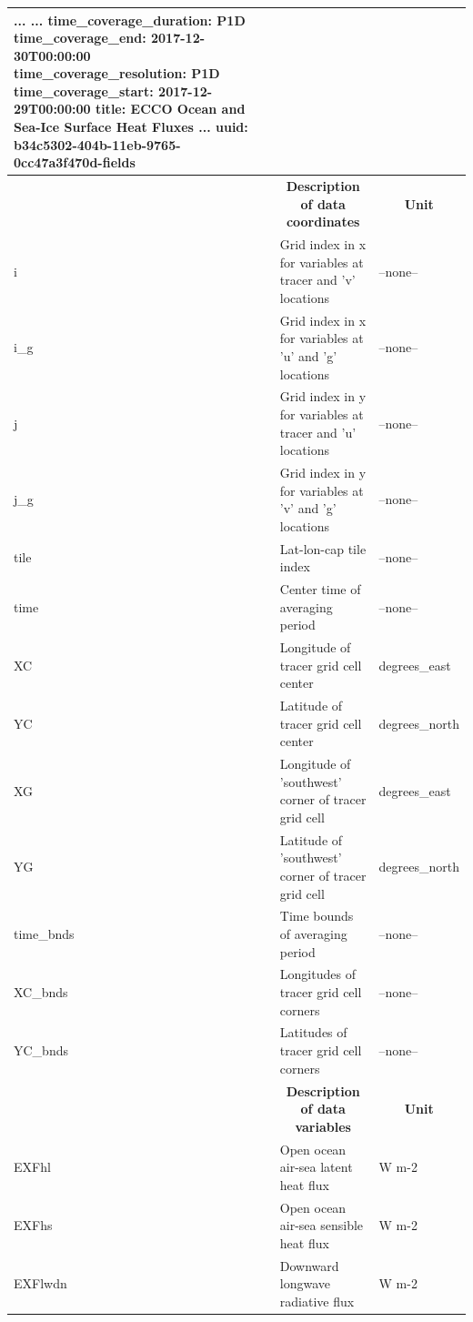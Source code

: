 \begin{longtable}{|m{}|m{}|m{}|}
{    ...                           ...
    time_coverage_duration:       P1D
    time_coverage_end:            2017-12-30T00:00:00
    time_coverage_resolution:     P1D
    time_coverage_start:          2017-12-29T00:00:00
    title:                        ECCO Ocean and Sea-Ice Surface Heat Fluxes ...
    uuid:                         b34c5302-404b-11eb-9765-0cc47a3f470d-fields} \\ 
\hline \endhead \hline \endfoot
\rowcolor{lightgray} \multicolumn{1}{|c|}{\textbf{Coordinates}} & \multicolumn{1}{|c|}{\textbf{Description of data coordinates}} &  \multicolumn{1}{|c|}{\textbf{Unit}}\\ \hline
i &Grid index in x for variables at tracer and 'v' locations &--none--  \\ \hline
i\_g &Grid index in x for variables at 'u' and 'g' locations &--none--  \\ \hline
j &Grid index in y for variables at tracer and 'u' locations &--none--  \\ \hline
j\_g &Grid index in y for variables at 'v' and 'g' locations &--none--  \\ \hline
tile &Lat-lon-cap tile index &--none--  \\ \hline
time &Center time of averaging period &--none--  \\ \hline
XC &Longitude of tracer grid cell center &degrees\_east  \\ \hline
YC &Latitude of tracer grid cell center &degrees\_north  \\ \hline
XG &Longitude of 'southwest' corner of tracer grid cell &degrees\_east  \\ \hline
YG &Latitude of 'southwest' corner of tracer grid cell &degrees\_north  \\ \hline
time\_bnds &Time bounds of averaging period &--none--  \\ \hline
XC\_bnds &Longitudes of tracer grid cell corners &--none--  \\ \hline
YC\_bnds &Latitudes of tracer grid cell corners &--none--  \\ \hline
\rowcolor{lightgray} \multicolumn{1}{|c|}{\textbf{Variables}} & \multicolumn{1}{|c|}{\textbf{Description of data variables}} &  \multicolumn{1}{|c|}{\textbf{Unit}}\\ \hline
EXFhl &Open ocean air-sea latent heat flux &W m-2  \\ \hline
EXFhs &Open ocean air-sea sensible heat flux &W m-2  \\ \hline
EXFlwdn &Downward longwave radiative flux &W m-2  \\ \hline

\end{longtable}
